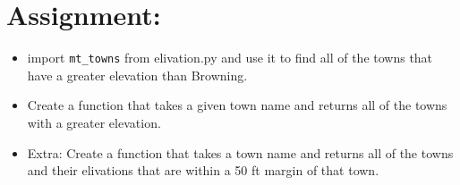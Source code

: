 \documentclass[../main.tex]{subfiles}
\begin{document}
\section{Assignment:}
\begin{itemize}
    \item import \texttt{mt\_towns} from elivation.py and use it to find all of the towns that have a greater elevation than Browning.
    \item Create a function that takes a given town name and returns all of the towns with a greater elevation.
    \item Extra: Create a function that takes a town name and returns all of the towns and their elivations that are within a 50 ft margin of that town.
\end{itemize}

\newpage
\end{document}
